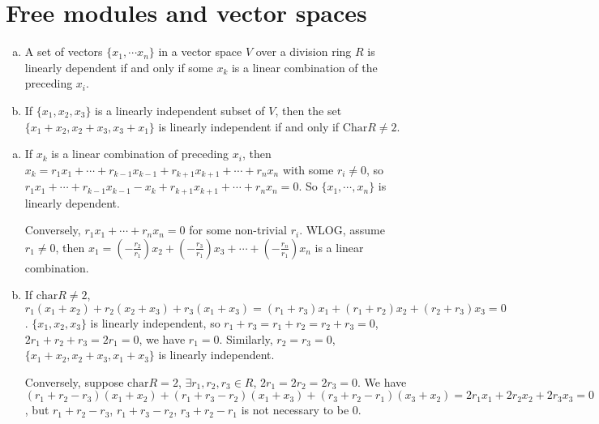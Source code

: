 \section{Free modules and vector spaces}
\begin{ex}
    \begin{enumerate}[(a)]
        \item A set of vectors $\{x_{1},\cdots x_{n}\}$ in a vector space $V$ over a division ring $R$ is linearly dependent if and only if some $x_{k}$ is a linear combination of the preceding $x_{i}$.
        \item If $\{x_{1},x_{2},x_{3}\}$ is a linearly independent subset of $V$, then the set $\{x_{1}+x_{2},x_{2}+x_{3},x_{3}+x_{1}\}$ is linearly independent if and only if $\mathrm{Char}R\neq 2$.
    \end{enumerate}
\end{ex}

\begin{answer}
    \begin{enumerate}[(a)]
        \item If $x_{k}$ is a linear combination of preceding $x_{i}$, then $x_{k}=r_{1}x_{1}+\cdots+r_{k-1}x_{k-1}+r_{k+1}x_{k+1}+\cdots+ r_{n}x_{n}$ with some $r_{i}\neq 0$, so $r_{1}x_{1}+\cdots+r_{k-1}x_{k-1}-x_{k}+r_{k+1}x_{k+1}+\cdots +r_{n}x_{n}=0$. So $\{x_{1},\cdots,x_{n}\}$ is linearly dependent.
        
        Conversely, $r_{1}x_{1}+\cdots+r_{n}x_{n}=0$ for some non-trivial $r_{i}$. WLOG, assume $r_{1}\neq 0$, then $x_{1}=(-\frac{r_{2}}{r_{1}})x_{2}+(-\frac{r_{3}}{r_{1}})x_{3}+\cdots+(-\frac{r_{n}}{r_{1}})x_{n}$ is a linear combination.
        \item If $\mathrm{char} R\neq 2$, $r_{1}(x_{1}+x_{2})+r_{2}(x_{2}+x_{3})+r_{3}(x_{1}+x_{3})=(r_{1}+r_{3})x_{1}+(r_{1}+r_{2})x_{2}+(r_{2}+r_{3})x_{3}=0$. $\{x_{1},x_{2},x_{3}\}$ is linearly independent, so $r_{1}+r_{3}=r_{1}+r_{2}=r_{2}+r_{3}=0$, $2r_{1}+r_{2}+r_{3}=2r_{1}=0$, we have $r_{1}=0$. Similarly, $r_{2}=r_{3}=0$, $\{x_{1}+x_{2},x_{2}+x_{3},x_{1}+x_{3}\}$ is linearly independent.
        
        Conversely, suppose $\mathrm{char}R=2$, $\exists r_{1},r_{2},r_{3}\in R$, $2r_{1}=2r_{2}=2r_{3}=0$. We have $(r_{1}+r_{2}-r_{3})(x_{1}+x_{2})+(r_{1}+r_{3}-r_{2})(x_{1}+x_{3})+(r_{3}+r_{2}-r_{1})(x_{3}+x_{2})=2r_{1}x_{1}+2r_{2}x_{2}+2r_{3}x_{3}=0$, but $r_{1}+r_{2}-r_{3}$, $r_{1}+r_{3}-r_{2}$, $r_{3}+r_{2}-r_{1}$ is not necessary to be 0.
    \end{enumerate}
\end{answer}


